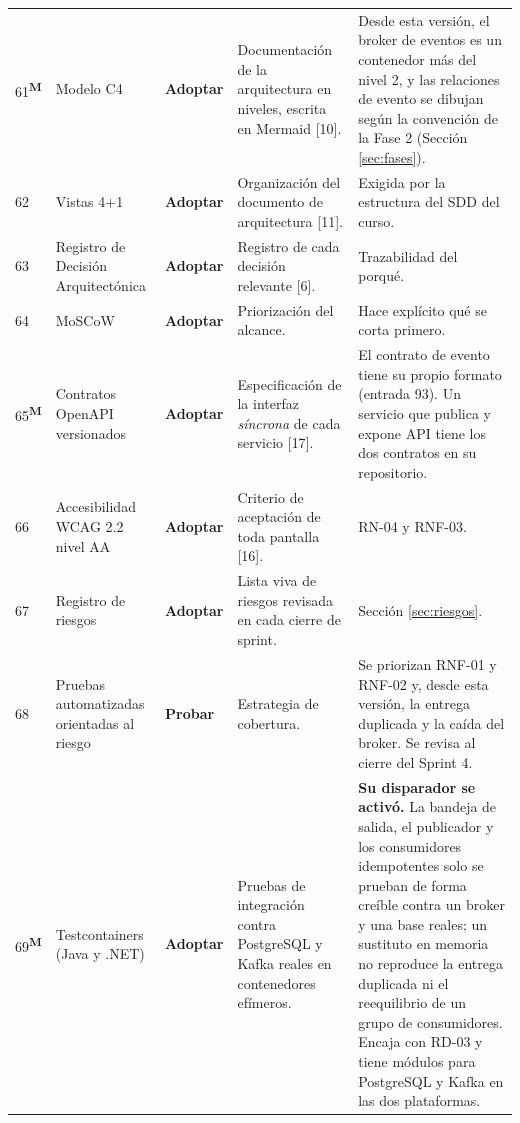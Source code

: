 \documentclass[11pt,a4paper]{article}
\newcommand{\adoptar}{\textcolor{ringAdoptar}{\textbf{Adoptar}}}
\newcommand{\probar}{\textcolor{ringProbar}{\textbf{Probar}}}
\newcommand{\modif}{\textsuperscript{\textcolor{ringProbar}{\scriptsize\bfseries M}}}
\begin{document}
\begin{longtable}{L{0.8cm} L{2.6cm} L{1.6cm} L{4.1cm} L{4.5cm}}
61\modif & Modelo C4 & \adoptar{} & Documentación de la arquitectura en niveles, escrita en Mermaid {[}10{]}. & Desde esta versión, el broker de eventos es un contenedor más del nivel 2, y las relaciones de evento se dibujan según la convención de la Fase 2 (Sección \ref{sec:fases}). \\

62 & Vistas 4+1 & \adoptar{} & Organización del documento de arquitectura {[}11{]}. & Exigida por la estructura del SDD del curso. \\

63 & Registro de Decisión Arquitectónica & \adoptar{} & Registro de cada decisión relevante {[}6{]}. & Trazabilidad del porqué. \\

64 & MoSCoW & \adoptar{} & Priorización del alcance. & Hace explícito qué se corta primero. \\

65\modif & Contratos OpenAPI versionados & \adoptar{} & Especificación de la interfaz \emph{síncrona} de cada servicio {[}17{]}. & El contrato de evento tiene su propio formato (entrada 93). Un servicio que publica y expone API tiene los dos contratos en su repositorio. \\

66 & Accesibilidad WCAG 2.2 nivel AA & \adoptar{} & Criterio de aceptación de toda pantalla {[}16{]}. & RN-04 y RNF-03. \\

67 & Registro de riesgos & \adoptar{} & Lista viva de riesgos revisada en cada cierre de sprint. & Sección \ref{sec:riesgos}. \\

68 & Pruebas automatizadas orientadas al riesgo & \probar{} & Estrategia de cobertura. & Se priorizan RNF-01 y RNF-02 y, desde esta versión, la entrega duplicada y la caída del broker. Se revisa al cierre del Sprint 4. \\

69\modif & Testcontainers (Java y .NET) & \adoptar{} & Pruebas de integración contra PostgreSQL y Kafka reales en contenedores efímeros. & \textbf{Su disparador se activó.} La bandeja de salida, el publicador y los consumidores idempotentes solo se prueban de forma creíble contra un broker y una base reales; un sustituto en memoria no reproduce la entrega duplicada ni el reequilibrio de un grupo de consumidores. Encaja con RD-03 y tiene módulos para PostgreSQL y Kafka en las dos plataformas. \\


\end{longtable}
\end{document}
